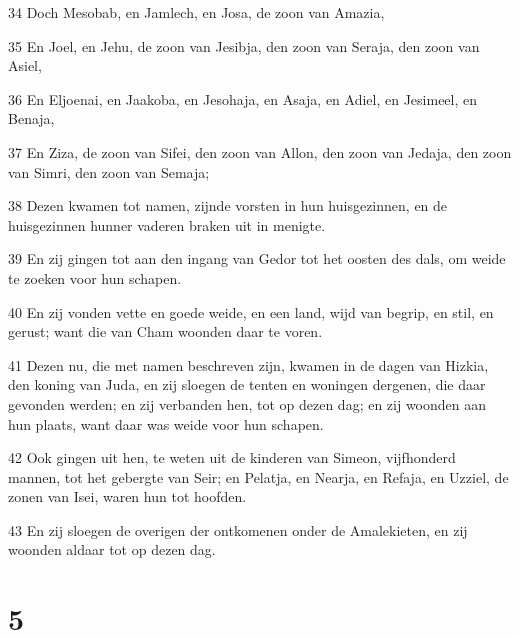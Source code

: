 \par 34 Doch Mesobab, en Jamlech, en Josa, de zoon van Amazia,
\par 35 En Joel, en Jehu, de zoon van Jesibja, den zoon van Seraja, den zoon van Asiel,
\par 36 En Eljoenai, en Jaakoba, en Jesohaja, en Asaja, en Adiel, en Jesimeel, en Benaja,
\par 37 En Ziza, de zoon van Sifei, den zoon van Allon, den zoon van Jedaja, den zoon van Simri, den zoon van Semaja;
\par 38 Dezen kwamen tot namen, zijnde vorsten in hun huisgezinnen, en de huisgezinnen hunner vaderen braken uit in menigte.
\par 39 En zij gingen tot aan den ingang van Gedor tot het oosten des dals, om weide te zoeken voor hun schapen.
\par 40 En zij vonden vette en goede weide, en een land, wijd van begrip, en stil, en gerust; want die van Cham woonden daar te voren.
\par 41 Dezen nu, die met namen beschreven zijn, kwamen in de dagen van Hizkia, den koning van Juda, en zij sloegen de tenten en woningen dergenen, die daar gevonden werden; en zij verbanden hen, tot op dezen dag; en zij woonden aan hun plaats, want daar was weide voor hun schapen.
\par 42 Ook gingen uit hen, te weten uit de kinderen van Simeon, vijfhonderd mannen, tot het gebergte van Seir; en Pelatja, en Nearja, en Refaja, en Uzziel, de zonen van Isei, waren hun tot hoofden.
\par 43 En zij sloegen de overigen der ontkomenen onder de Amalekieten, en zij woonden aldaar tot op dezen dag.

\chapter{5}

